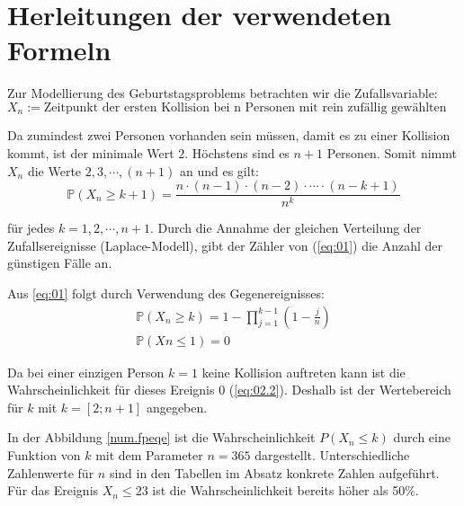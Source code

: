 \documentclass[../main.tex]{subfiles}
\begin{document}
    \section{Herleitungen der verwendeten Formeln}\label{sec:herleitungen-der-verwendeten-formeln}
    \begin{flushleft}
        Zur Modellierung des Geburtstagsproblems betrachten wir die Zufallsvariable:
        \begin{equation}
            X_{ n } := \text{Zeitpunkt der ersten Kollision bei n Personen mit rein zufällig gewählten Geburtstagen} \label {first}
        \end{equation}


        Da zumindest zwei Personen vorhanden sein müssen, damit es zu einer Kollision kommt, ist der minimale Wert $2$. Höchstens sind es $n + 1$ Personen. Somit nimmt $X_{ n }$ die Werte $2,3,\cdots ,(n+1)$ an und es gilt:
        \begin{equation}
            \label{eq:01}
            \mathbb{P}(X_{ n } \geq k + 1)  = \frac{ n \cdot (n - 1) \cdot (n - 2) \cdot \cdots \cdot (n - k + 1) }{ n^k }
        \end{equation}

        für jedes $k = 1,2,\cdots,n + 1$. Durch die Annahme der gleichen Verteilung der Zufallsereignisse (Laplace-Modell), gibt der Zähler von (\ref{eq:01}) die Anzahl der günstigen Fälle an. \newline

        Aus \ref{eq:01} folgt durch Verwendung des Gegenereignisses:
        \begin{eqnarray}
            \mathbb{P}(X_{ n } \geq k) = 1 - \prod_{ j=1 }^{k-1}{ (1 - \frac{ j }{ n }) }  \label{eq:02.1} \\
            \mathbb{P}(Xn\leq 1) = 0  \label{eq:02.2}
        \end{eqnarray}

        Da bei einer einzigen Person $k = 1$ keine Kollision auftreten kann ist die Wahrscheinlichkeit für dieses Ereignis 0 (\ref{eq:02.2}). Deshalb ist der Wertebereich für $k$ mit $k = [2;n+1]$ angegeben. \newline

        In der Abbildung \ref{num.fpeqe} ist die Wahrscheinlichkeit $P(X_{n} \leq k)$ durch eine Funktion von $k$ mit dem Parameter $n = 365$ dargestellt. Unterschiedliche Zahlenwerte für $n$ sind in den Tabellen im Absatz konkrete Zahlen aufgeführt. Für das Ereignis $ X_{n} \leq 23 $ ist die Wahrscheinlichkeit bereits höher als 50\%. \newline


\end{flushleft}
\end{document}
